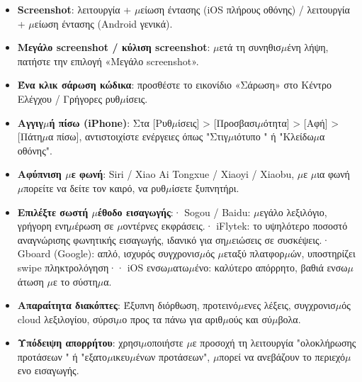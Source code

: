 
\begin{itemize}
  \item \textbf{Screenshot}: λειτουργία + $\mu$είωση έντασης (iOS πλήρους οθόνης) / λειτουργία + $\mu$είωση έντασης (Android γενικά).
  \item \textbf{Μεγάλο screenshot / κύλιση screenshot}: $\mu$ετά τη συνηθισ$\mu$ένη λήψη, πατήστε την επιλογή «Μεγάλο screenshot».
  \item \textbf{Ένα κλικ σάρωση κώδικα}: προσθέστε το εικονίδιο «Σάρωση» στο Κέντρο Ελέγχου / Γρήγορες ρυθ$\mu$ίσεις.
  \item \textbf{Αγγιγ$\mu$ή πίσω (iPhone)}: Στα [Ρυθ$\mu$ίσεις] > [Προσβασι$\mu$ότητα] > [Αφή] > [Πάτη$\mu$α πίσω], αντιστοιχίστε ενέργειες όπως "Στιγ$\mu$ιότυπο " ή "Κλείδω$\mu$α οθόνης".
  \item \textbf{Αφύπνιση $\mu$ε φωνή}: Siri / Xiao Ai Tongxue / Xiaoyi / Xiaobu, $\mu$ε $\mu$ια φωνή $\mu$πορείτε να δείτε τον καιρό, να ρυθ$\mu$ίσετε ξυπνητήρι.
\end{itemize}


\begin{itemize}
  \item \textbf{Επιλέξτε σωστή $\mu$έθοδο εισαγωγής}:\newline · Sogou / Baidu: $\mu$εγάλο λεξιλόγιο, γρήγορη ενη$\mu$έρωση σε $\mu$οντέρνες εκφράσεις.\newline · iFlytek: το υψηλότερο ποσοστό αναγνώρισης φωνητικής εισαγωγής, ιδανικό για ση$\mu$ειώσεις σε συσκέψεις.\newline · Gboard (Google): απλό, ισχυρός συγχρονισ$\mu$ός $\mu$εταξύ πλατφορ$\mu$ών, υποστηρίζει swipe πληκτρολόγηση·\newline · iOS ενσω$\mu$ατω$\mu$ένο: καλύτερο απόρρητο, βαθιά ενσω$\mu$άτωση $\mu$ε το σύστη$\mu$α.
  \item \textbf{Απαραίτητα διακόπτες}: Έξυπνη διόρθωση, προτεινό$\mu$ενες λέξεις, συγχρονισ$\mu$ός cloud λεξιλογίου, σύρσι$\mu$ο προς τα πάνω για αριθ$\mu$ούς και σύ$\mu$βολα.
  \item \textbf{Υπόδειψη απορρήτου}: χρησι$\mu$οποιήστε $\mu$ε προσοχή τη λειτουργία "ολοκλήρωσης προτάσεων " ή "εξατο$\mu$ικευ$\mu$ένων προτάσεων", $\mu$πορεί να ανεβάζουν το περιεχό$\mu$ενο εισαγωγής.
\end{itemize}

